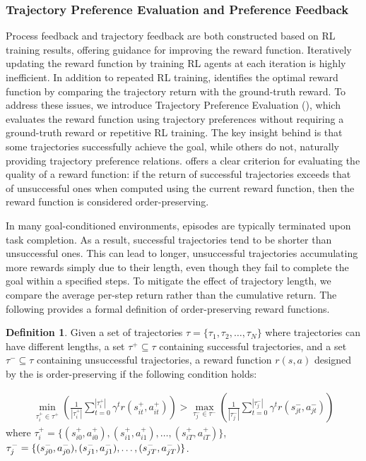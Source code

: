 \documentclass{article}
\theoremstyle{plain}
\theoremstyle{definition}
\newtheorem{definition}[theorem]{Definition}
\theoremstyle{remark}
\begin{document}
\subsubsection{Trajectory Preference Evaluation and Preference Feedback}

Process feedback and trajectory feedback are both constructed based on RL training results, offering guidance for improving the reward function. Iteratively updating the reward function by training RL agents at each iteration is highly inefficient. In addition to repeated RL training, \eureka identifies the optimal reward function by comparing the trajectory return with the ground-truth reward. To address these issues, we introduce Trajectory Preference Evaluation (\TPE), which evaluates the reward function using trajectory preferences without requiring a ground-truth reward or repetitive RL training. The key insight behind \TPE is that some trajectories successfully achieve the goal, while others do not, naturally providing trajectory preference relations. \TPE offers a clear criterion for evaluating the quality of a reward function: if the return of successful trajectories exceeds that of unsuccessful ones when computed using the current reward function, then the reward function is considered order-preserving.

In many goal-conditioned environments, episodes are typically terminated upon task completion. As a result, successful trajectories tend to be shorter than unsuccessful ones. This can lead to longer, unsuccessful trajectories accumulating more rewards simply due to their length, even though they fail to complete the goal within a specified steps. To mitigate the effect of trajectory length, we compare the average per-step return rather than the cumulative return. The following provides a formal definition of order-preserving reward functions.

\begin{definition}

Given a set of trajectories $\tau = \{\tau_1, \tau_2, \dots, \tau_N\}$ where trajectories can have different lengths, a set $\tau^{+} \subseteq \tau$ containing successful trajectories, and a set $\tau^{-} \subseteq \tau$ containing unsuccessful trajectories, a reward function $r(s,a)$ designed by the \designer is order-preserving if the following condition holds:

\begin{equation}
\begin{aligned}
\min_{\tau_{i}^{+} \in \tau^{+}}\left(\frac{1}{|\tau_i^+|}\sum_{t=0}^{|\tau_i^+|} \gamma^{t} r(s_{it}^+, a_{it}^+)\right) > \max_{\tau_{j}^{-} \in \tau^{-}}\left(\frac{1}{|\tau_j^-|}\sum_{t=0}^{|\tau_j^-|} \gamma^{t}r(s_{jt}^-, a_{jt}^-)\right)
\end{aligned}
\end{equation}
where $\tau_{i}^{+}=\{(s_{i0}^+, a_{i0}^+), (s_{i1}^+, a_{i1}^+), \dots, (s_{iT}^+, a_{iT}^+)\}$, $\tau_{j}^{-}=\{(s_{j0}^-, a_{j0}^-), \\ (s_{j1}^-, a_{j1}^-), \dots, (s_{jT}^-, a_{jT}^-)\}$.
\end{definition}
\end{document}

